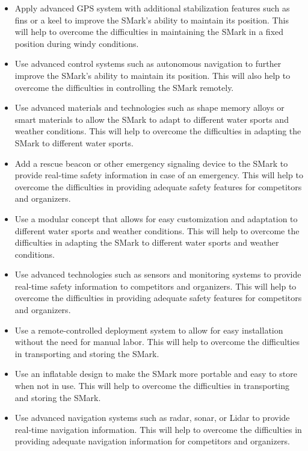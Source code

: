 \documentclass[12pt, twoside]{report}
\begin{document}
\begin{itemize}
\item Apply advanced GPS system with additional stabilization features such as fins or a keel to improve the SMark’s ability to maintain its position. This will help to overcome the difficulties in maintaining the SMark in a fixed position during windy conditions.
\item Use advanced control systems such as autonomous navigation to further improve the SMark’s ability to maintain its position. This will also help to overcome the difficulties in controlling the SMark remotely.
\item Use advanced materials and technologies such as shape memory alloys or smart materials to allow the SMark to adapt to different water sports and weather conditions. This will help to overcome the difficulties in adapting the SMark to different water sports.
\item Add a rescue beacon or other emergency signaling device to the SMark to provide real-time safety information in case of an emergency. This will help to overcome the difficulties in providing adequate safety features for competitors and organizers.
\item Use a modular concept that allows for easy customization and adaptation to different water sports and weather conditions. This will help to overcome the difficulties in adapting the SMark to different water sports and weather conditions.
\item Use advanced technologies such as sensors and monitoring systems to provide real-time safety information to competitors and organizers. This will help to overcome the difficulties in providing adequate safety features for competitors and organizers.
\item Use a remote-controlled deployment system to allow for easy installation without the need for manual labor. This will help to overcome the difficulties in transporting and storing the SMark.
\item Use an inflatable design to make the SMark more portable and easy to store when not in use. This will help to overcome the difficulties in transporting and storing the SMark.
\item Use advanced navigation systems such as radar, sonar, or Lidar to provide real-time navigation information. This will help to overcome the difficulties in providing adequate navigation information for competitors and organizers.
\end{itemize}
\end{document}
